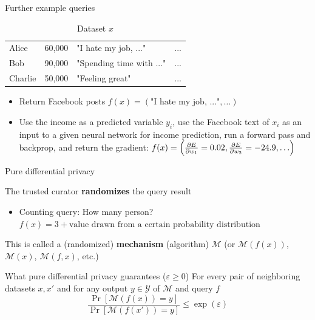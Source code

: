 \documentclass[12pt,aspectratio=169,handout]{beamer}
\begin{document}
\begin{frame}{Further example queries}
	\begin{table}
		\begin{tabular}{lrll}
			\toprule
			Alice & 60,000 & "I hate my job, ..." & ... \\
			Bob & 90,000 & "Spending time with ..." & ...\\
			Charlie & 50,000 & "Feeling great" & ...\\
			\bottomrule
		\end{tabular}
		\caption{Dataset $x$}
	\end{table}	

\begin{itemize}
	\item Return Facebook posts $f(x) = (\text{"I hate my job, ..."}, \ldots)$
	\item Use the income as a predicted variable $y_i$, use the Facebook text of $x_i$ as an input to a given neural network for income prediction, run a forward pass and backprop, and return the gradient: $f(x) = \left( \pdv{E}{w_1} = 0.02, \pdv{E}{w_2} = -24.9, \ldots \right)$
\end{itemize}

	
\end{frame}


\begin{frame}{Pure differential privacy}

The trusted curator \textbf{randomizes} the query result

\begin{itemize}
	\item Counting query: How many person? $f(x) = 3 + \text{value drawn from a certain probability distribution}$
\end{itemize}

This is called a (randomized) \textbf{mechanism} (algorithm) $\mathcal{M}$ (or $\mathcal{M}(f(x))$, $\mathcal{M}(x)$, $\mathcal{M}(f, x)$, etc.)

\begin{block}{What pure differential privacy guarantees ($\varepsilon \geq 0$)}
For every pair of neighboring datasets $x, x'$ and for any output $y \in \mathcal{Y}$ of $\mathcal{M}$ and query $f$
$$
\frac{
\Pr \left[ \mathcal{M}(f(x)) = y  \right]
}{
\Pr \left[ \mathcal{M}(f(x')) = y  \right]
}
\leq \exp(\varepsilon)
$$
\end{block}

	
\end{frame}
\end{document}
